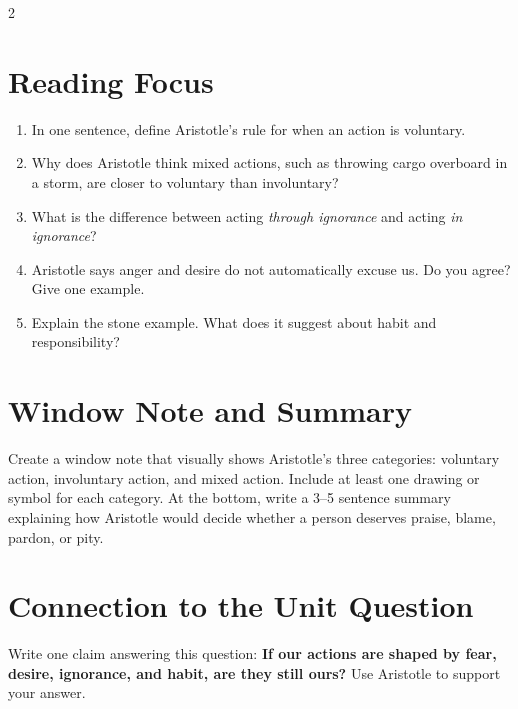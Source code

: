 \documentclass[12pt]{article}
\begin{document}
\begin{multicols}{2}
\section*{Reading Focus}
\begin{enumerate}[leftmargin=*]
\item In one sentence, define Aristotle's rule for when an action is voluntary.
\item Why does Aristotle think mixed actions, such as throwing cargo overboard in a storm, are closer to voluntary than involuntary?
\item What is the difference between acting \textit{through ignorance} and acting \textit{in ignorance}?
\item Aristotle says anger and desire do not automatically excuse us. Do you agree? Give one example.
\item Explain the stone example. What does it suggest about habit and responsibility?
\end{enumerate}

\section*{Window Note and Summary}
Create a window note that visually shows Aristotle's three categories: voluntary action, involuntary action, and mixed action. Include at least one drawing or symbol for each category. At the bottom, write a 3--5 sentence summary explaining how Aristotle would decide whether a person deserves praise, blame, pardon, or pity.

\section*{Connection to the Unit Question}
Write one claim answering this question: \textbf{If our actions are shaped by fear, desire, ignorance, and habit, are they still ours?} Use Aristotle to support your answer.
\end{multicols}
\end{document}
